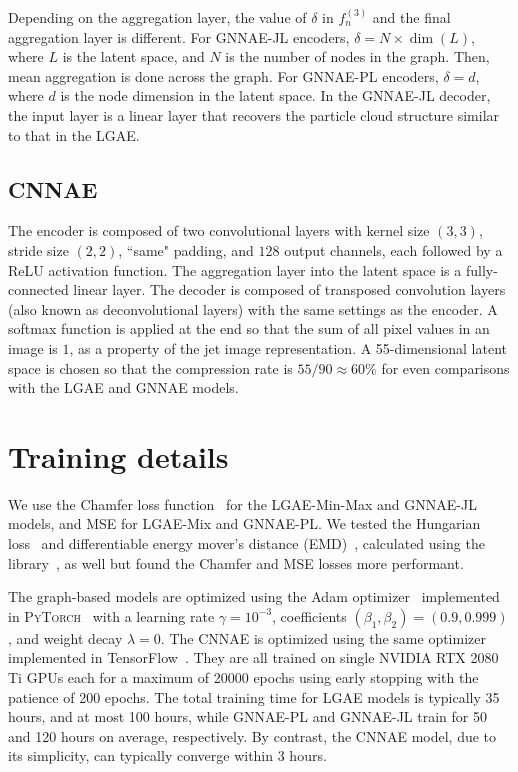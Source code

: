 Depending on the aggregation layer, the value of $\delta$ in $f_n^{(3)}$ and the final aggregation layer is different.
For GNNAE-JL encoders, $\delta = N \times \dim(L)$, where $L$ is the latent space, and $N$ is the number of nodes in the graph.
Then, mean aggregation is done across the graph.
For GNNAE-PL encoders, $\delta = d$, where $d$ is the node dimension in the latent space.
In the GNNAE-JL decoder, the input layer is a linear layer that recovers the particle cloud structure similar to that in the LGAE.

\subsection{CNNAE}
The encoder is composed of two convolutional layers with kernel size $(3, 3)$, stride size $(2, 2)$, ``same" padding, and $128$ output channels, each followed by a ReLU activation function. 
The aggregation layer into the latent space is a fully-connected linear layer. 
The decoder is composed of transposed convolution layers (also known as deconvolutional layers) with the same settings as the encoder. 
A softmax function is applied at the end so that the sum of all pixel values in an image is $1$, as a property of the jet image representation.
A 55-dimensional latent space  is chosen so that the compression rate is $55/90 \approx 60\%$ for even comparisons with the LGAE and GNNAE models.



\section{Training details}
\label{app:06_lgae_training}
We use the Chamfer loss function~\cite{10.5555/1622943.1622971,Fan_2017_CVPR,Zhang2020FSPool} for the LGAE-Min-Max and GNNAE-JL models, and  MSE for LGAE-Mix and GNNAE-PL.
We tested the Hungarian loss~\cite{hungarian,2020SciPy-NMeth} and differentiable energy mover's distance (EMD)~\cite{Komiske:2019fks}, calculated using the \jetnet library~\cite{jetnetlibrary}, as well but found the Chamfer and MSE losses more performant.

The graph-based models are optimized using the Adam optimizer~\cite{kigma2015adam}
implemented in \textsc{PyTorch}~\cite{pytorch}
with a learning rate $\gamma = 10^{-3}$, coefficients $(\beta_1, \beta_2) = (0.9, 0.999)$, and weight decay $\lambda = 0$.
The CNNAE is optimized using the same optimizer implemented in TensorFlow~\cite{tensorflow2015-whitepaper}. 
They are all trained on single NVIDIA RTX 2080 Ti GPUs each for a maximum of 20000 epochs using early stopping with the patience of 200 epochs.
The total training time for LGAE models is typically 35 hours, and at most 100 hours, while GNNAE-PL and GNNAE-JL train for 50 and 120 hours on average, respectively.
By contrast, the CNNAE model, due to its simplicity, can typically converge within 3 hours.



